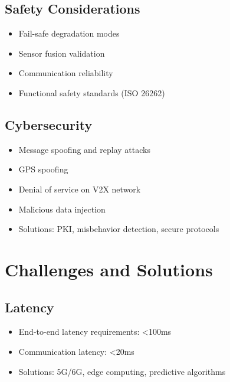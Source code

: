 \documentclass[12pt,a4paper]{article}
\begin{document}
\subsection{Safety Considerations}

\begin{itemize}
    \item Fail-safe degradation modes
    \item Sensor fusion validation
    \item Communication reliability
    \item Functional safety standards (ISO 26262)
\end{itemize}

\subsection{Cybersecurity}

\begin{tcolorbox}[colback=infrared!10, colframe=infrared, title=V2X Security Threats]
\begin{itemize}
    \item Message spoofing and replay attacks
    \item GPS spoofing
    \item Denial of service on V2X network
    \item Malicious data injection
    \item Solutions: PKI, misbehavior detection, secure protocols
\end{itemize}
\end{tcolorbox}

\section{Challenges and Solutions}

\subsection{Latency}

\begin{itemize}
    \item End-to-end latency requirements: <100ms
    \item Communication latency: <20ms
    \item Solutions: 5G/6G, edge computing, predictive algorithms
\end{itemize}
\end{document}
